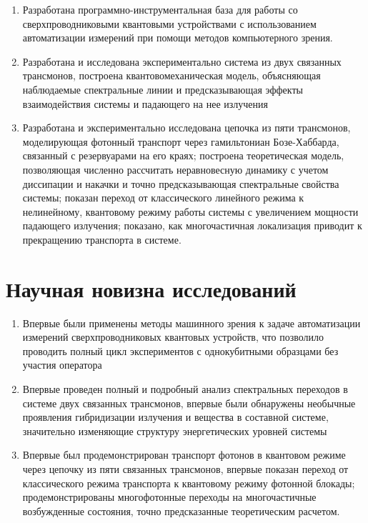 \documentclass[14pt, a4paper]{extreport}
\numberwithin{equation}{section}
\begin{document}
\begin{enumerate}
	\item Разработана программно-инструментальная база для работы со сверхпроводниковыми квантовыми устройствами с использованием автоматизации измерений при помощи методов компьютерного зрения.
	\item Разработана и исследована экспериментально система из двух связанных трансмонов, построена квантовомеханическая модель, объясняющая наблюдаемые спектральные линии и предсказывающая эффекты взаимодействия системы и падающего на нее излучения
	\item Разработана и экспериментально исследована цепочка из пяти трансмонов, моделирующая фотонный транспорт через гамильтониан Бозе\hyp Хаббарда, связанный с резервуарами на его краях; построена теоретическая модель, позволяющая численно рассчитать неравновесную динамику с учетом диссипации и накачки и точно предсказывающая спектральные свойства системы; показан переход от классического линейного режима к нелинейному, квантовому режиму работы системы с увеличением мощности падающего излучения; показано, как многочастичная локализация приводит к прекращению транспорта в системе.
\end{enumerate}
	
\section*{Научная новизна исследований}

\begin{enumerate}
	\item Впервые были применены методы машинного зрения к задаче автоматизации измерений сверхпроводниковых квантовых устройств, что позволило проводить полный цикл экспериментов с однокубитными образцами без участия оператора
	\item Впервые проведен полный и подробный анализ спектральных переходов в системе двух связанных трансмонов, впервые были обнаружены необычные проявления гибридизации излучения и вещества в составной системе, значительно изменяющие структуру энергетических уровней системы
	\item Впервые был продемонстрирован транспорт фотонов в квантовом режиме через цепочку из пяти связанных трансмонов, впервые показан переход от классического режима транспорта к квантовому режиму фотонной блокады; продемонстрированы многофотонные переходы на многочастичные возбужденные состояния, точно предсказанные теоретическим расчетом.
\end{enumerate}
\end{document}

